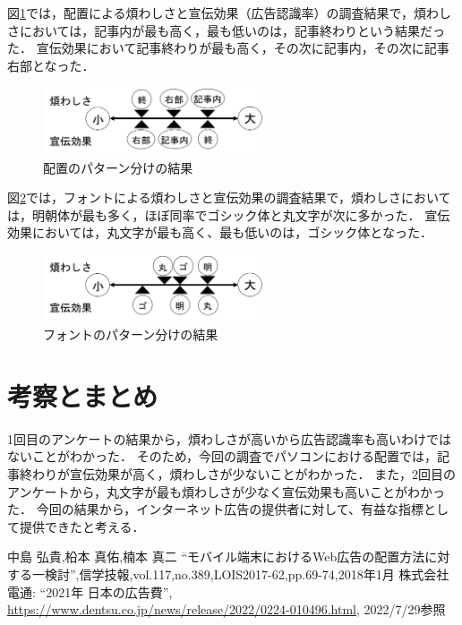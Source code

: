 \documentclass[twocolumn,10pt,a4j]{ltjsarticle}
\begin{document}
図\ref{fig:結果1}では，配置による煩わしさと宣伝効果（広告認識率）の調査結果で，煩わしさにおいては，記事内が最も高く，最も低いのは，記事終わりという結果だった．
宣伝効果において記事終わりが最も高く，その次に記事内，その次に記事右部となった．

\begin{figure}[h]
\begin{center}
 \includegraphics[clip,width=65mm,height=20mm]{結果1.png}
\end{center}
 \caption{配置のパターン分けの結果}
 \label{fig:結果1}
\end{figure}

図\ref{fig:結果2}では，フォントによる煩わしさと宣伝効果の調査結果で，煩わしさにおいては，明朝体が最も多く，ほぼ同率でゴシック体と丸文字が次に多かった．
宣伝効果においては，丸文字が最も高く、最も低いのは，ゴシック体となった．
\begin{figure}[h]
\begin{center}
 \includegraphics[clip,width=65mm,height=20mm]{結果2.png}
\end{center}
 \caption{フォントのパターン分けの結果}
 \label{fig:結果2}
\end{figure}

\section{考察とまとめ}
1回目のアンケートの結果から，煩わしさが高いから広告認識率も高いわけではないことがわかった．
そのため，今回の調査でパソコンにおける配置では，記事終わりが宣伝効果が高く，煩わしさが少ないことがわかった．
また，2回目のアンケートから，丸文字が最も煩わしさが少なく宣伝効果も高いことがわかった．
今回の結果から，インターネット広告の提供者に対して、有益な指標として提供できたと考える．
\begin{thebibliography}{99}
 中島 弘貴,柗本 真佑,楠本 真二 ``モバイル端末におけるWeb広告の配置方法に対する一検討'',信学技報,vol.117,no.389,LOIS2017-62,pp.69-74,2018年1月
 株式会社電通: ``2021年 日本の広告費'', \url{https://www.dentsu.co.jp/news/release/2022/0224-010496.html}, 2022/7/29参照
\end{thebibliography}
\end{document}
